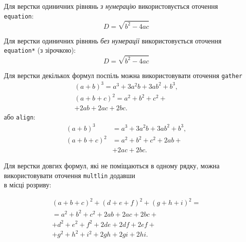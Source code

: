 \documentclass[]{iptconf}
\begin{document}
Для верстки одиничних рівнянь \textit{з нумерацію} використовується оточення \texttt{equation}:
\begin{equation}
	\label{eq:Diskriminant} %
	D = \sqrt {{b^2} - 4ac}
\end{equation}

Для верстки одиничних рівнянь \textit{без нумерації} використовується оточення \texttt{equation*}
(з зірочкою):
\begin{equation*}
	D = \sqrt {{b^2} - 4ac}
\end{equation*}

Для верстки декількох формул поспіль можна використовувати оточення \texttt{gather}
\begin{gather}
	(a+b)^3 = a^3 + 3a^2b + 3ab^2 + b^3,\\
	(a+b+c)^2 = a^2 + b^2 + c^2 +\nonumber\\
	+ 2ab + 2ac + 2bc.
\end{gather}
або \texttt{align}:
\begin{align}\label{eq:aligned_equation}
	(a+b)^3   & = a^3 + 3a^2b + 3ab^2 + b^3,        \\
	(a+b+c)^2 & = a^2 + b^2 + c^2 + 2ab + \nonumber \\
	          & + 2ac + 2bc.
\end{align}

Для верстки довгих формул, які не поміщаються в одному рядку, можна використовувати
оточення \texttt{multlin} додавши \texttt{\string\\} в місці розриву:

\begin{multline}\label{eq:multined_equation}
	(a+b+c)^2 + (d+e+f)^2 + (g+h+i)^2 = \\
	= a^2 + b^2 + c^2 + 2ab + 2ac + 2bc +\\
	+d^2 + e^2 + f^2 + 2de + 2df + 2ef +\\
	+g^2 + h^2 + i^2 + 2gh + 2gi + 2hi.
\end{multline}


\end{document}
